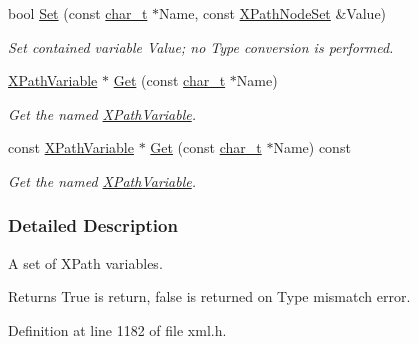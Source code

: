 \begin{DoxyCompactItemize}
bool \hyperlink{classphys_1_1xml_1_1XPathVariableSet_a61fe3aa60d13a4a224d301456a230a7c}{Set} (const \hyperlink{namespacephys_1_1xml_afc87705cd1c2917d87b879715a2d8f6e}{char\_\-t} $\ast$Name, const \hyperlink{classphys_1_1xml_1_1XPathNodeSet}{XPathNodeSet} \&Value)
\begin{DoxyCompactList}\small\item\em Set contained variable Value; no Type conversion is performed. \item\end{DoxyCompactList}\item 
\hyperlink{classphys_1_1xml_1_1XPathVariable}{XPathVariable} $\ast$ \hyperlink{classphys_1_1xml_1_1XPathVariableSet_aaf4a46b271298bbb86a6379567e590ee}{Get} (const \hyperlink{namespacephys_1_1xml_afc87705cd1c2917d87b879715a2d8f6e}{char\_\-t} $\ast$Name)
\begin{DoxyCompactList}\small\item\em Get the named \hyperlink{classphys_1_1xml_1_1XPathVariable}{XPathVariable}. \item\end{DoxyCompactList}\item 
const \hyperlink{classphys_1_1xml_1_1XPathVariable}{XPathVariable} $\ast$ \hyperlink{classphys_1_1xml_1_1XPathVariableSet_a64274e4889036c318c701614d2cfa5ab}{Get} (const \hyperlink{namespacephys_1_1xml_afc87705cd1c2917d87b879715a2d8f6e}{char\_\-t} $\ast$Name) const 
\begin{DoxyCompactList}\small\item\em Get the named \hyperlink{classphys_1_1xml_1_1XPathVariable}{XPathVariable}. \item\end{DoxyCompactList}\end{DoxyCompactItemize}


\subsubsection{Detailed Description}
A set of XPath variables. \begin{DoxyReturn}{Returns}
True is return, false is returned on Type mismatch error. 
\end{DoxyReturn}


Definition at line 1182 of file xml.h.



